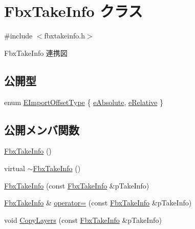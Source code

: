 \hypertarget{class_fbx_take_info}{}\section{Fbx\+Take\+Info クラス}
\label{class_fbx_take_info}


{\ttfamily \#include $<$fbxtakeinfo.\+h$>$}



Fbx\+Take\+Info 連携図
\subsection*{公開型}
\begin{DoxyCompactItemize}
\item 
enum \hyperlink{class_fbx_take_info_a64a38a536155104dfa7bc79ffb7ef8dc}{E\+Import\+Offset\+Type} \{ \hyperlink{class_fbx_take_info_a64a38a536155104dfa7bc79ffb7ef8dca51c6f34964217ede4adc8c0975517f57}{e\+Absolute}, 
\hyperlink{class_fbx_take_info_a64a38a536155104dfa7bc79ffb7ef8dcad4ae9cdb8f45343878006508a84546df}{e\+Relative}
 \}
\end{DoxyCompactItemize}
\subsection*{公開メンバ関数}
\begin{DoxyCompactItemize}
\item 
\hyperlink{class_fbx_take_info_a0c99af4f277140834959403672643869}{Fbx\+Take\+Info} ()
\item 
virtual \hyperlink{class_fbx_take_info_aab3be12b6326df91b6dea9601e9f079f}{$\sim$\+Fbx\+Take\+Info} ()
\item 
\hyperlink{class_fbx_take_info_a5789a72ffbcf99bc3501f6d52ff3912e}{Fbx\+Take\+Info} (const \hyperlink{class_fbx_take_info}{Fbx\+Take\+Info} \&p\+Take\+Info)
\item 
\hyperlink{class_fbx_take_info}{Fbx\+Take\+Info} \& \hyperlink{class_fbx_take_info_abbce118f64f716e965162ddcaacc024b}{operator=} (const \hyperlink{class_fbx_take_info}{Fbx\+Take\+Info} \&p\+Take\+Info)
\item 
void \hyperlink{class_fbx_take_info_ac8e073b31c0de56fc7dbfcdd006d4f3f}{Copy\+Layers} (const \hyperlink{class_fbx_take_info}{Fbx\+Take\+Info} \&p\+Take\+Info)
\end{DoxyCompactItemize}
